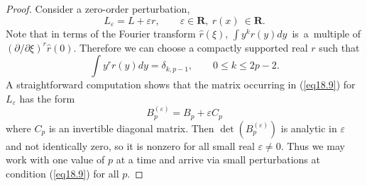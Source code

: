 \documentclass{surv-l}
\theoremstyle{plain}
\theoremstyle{definition}
\numberwithin{equation}{chapter}
\begin{document}
\begin{proof}
Consider a zero-order perturbation,
\begin{equation*}
L_{\varepsilon}=L+\varepsilon r,\qquad \varepsilon\in \mathbf{R},\ r(x)\ \in \mathbf{R}.
\end{equation*}
Note that in terms of the Fourier transform $\hat{r}(\xi),\,\int y^{k}r(y)dy$  \,is\, a\, multiple of $(\partial/\partial\xi)^{r}\hat{r}(0)$. Therefore we can choose a compactly supported real $r$ such that
\begin{equation*}
\int y^{r}r(y)dy=\delta_{k,p-1},\qquad 0\leq k\leq 2p-2.
\end{equation*}
A straightforward computation shows that the matrix occurring in (\ref{eq18.9}) for $L_{\varepsilon}$ has the form
\begin{equation*}
B_{p}^{(\varepsilon)}=B_{p}+\varepsilon C_{p}
\end{equation*}
where $C_{p}$ is an invertible diagonal matrix. Then $\det(B_{p}^{(\varepsilon)})$ is analytic in $\varepsilon$
and not identically zero, so it is nonzero for all small real $\varepsilon \neq 0$. Thus we may work with one value of $p$ at a time and arrive via small perturbations at condition (\ref{eq18.9}) for all $p$.
\end{proof}
\end{document}
